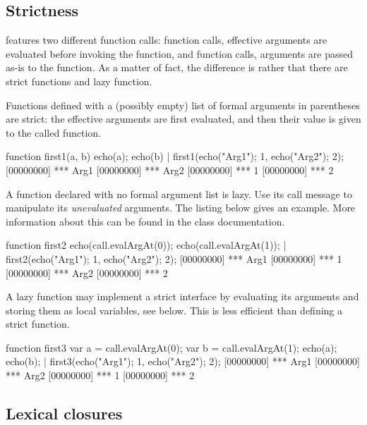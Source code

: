 \subsection{Strictness}

\us features two different function calls:
 function calls, effective arguments are
evaluated before invoking the function, and 
function calls, arguments are passed as-is to the function.  As a
matter of fact, the difference is rather that there are strict
functions and lazy function.

Functions defined with a (possibly empty) list of formal arguments in
parentheses are strict: the effective arguments are first evaluated,
and then their value is given to the called function.

\begin{urbiscript}[firstnumber=last]
function first1(a, b) {
  echo(a); echo(b)
}|
first1({echo("Arg1"); 1},
       {echo("Arg2"); 2});
[00000000] *** Arg1
[00000000] *** Arg2
[00000000] *** 1
[00000000] *** 2
\end{urbiscript}

A function declared with no formal argument list is lazy.  Use its
call message to manipulate its \emph{unevaluated} arguments.
The listing below gives an example.  More information about
this can be found in the  class documentation.

\begin{urbiscript}[firstnumber=last]
function first2
{
  echo(call.evalArgAt(0));
  echo(call.evalArgAt(1));
}|
first2({echo("Arg1"); 1},
       {echo("Arg2"); 2});
[00000000] *** Arg1
[00000000] *** 1
[00000000] *** Arg2
[00000000] *** 2
\end{urbiscript}

A lazy function may implement a strict interface by evaluating its
arguments and storing them as local variables, see below.  This is
less efficient than defining a strict function.

\begin{urbiscript}[firstnumber=last]
function first3
{
  var a = call.evalArgAt(0);
  var b = call.evalArgAt(1);
  echo(a); echo(b);
}|
first3({echo("Arg1"); 1},
       {echo("Arg2"); 2});
[00000000] *** Arg1
[00000000] *** Arg2
[00000000] *** 1
[00000000] *** 2
\end{urbiscript}

\subsection{Lexical closures}
\label{sec:us-fun-closures}

